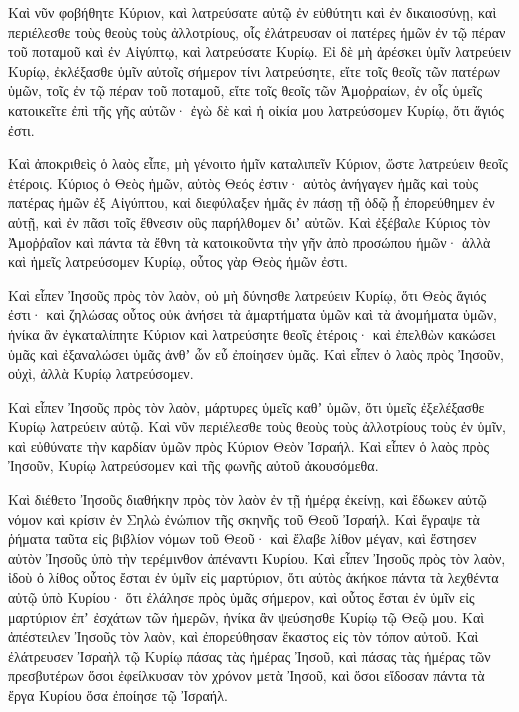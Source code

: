 {\par }{\PP {}Καὶ νῦν φοβήθητε Κύριον, καὶ λατρεύσατε αὐτῷ ἐν εὐθύτητι καὶ ἐν δικαιοσύνῃ, καὶ περιέλεσθε τοὺς θεοὺς τοὺς ἀλλοτρίους, οἷς ἐλάτρευσαν οἱ πατέρες ἡμῶν ἐν τῷ πέραν τοῦ ποταμοῦ καὶ ἐν Αἰγύπτῳ, καὶ λατρεύσατε Κυρίῳ.
Εἰ δὲ μὴ ἀρέσκει ὑμῖν λατρεύειν Κυρίῳ, ἐκλέξασθε ὑμῖν αὐτοῖς σήμερον τίνι λατρεύσητε, εἴτε τοῖς θεοῖς τῶν πατέρων ὑμῶν, τοῖς ἐν τῷ πέραν τοῦ ποταμοῦ, εἴτε τοῖς θεοῖς τῶν Ἀμοῤραίων, ἐν οἷς ὑμεῖς κατοικεῖτε ἐπὶ τῆς γῆς αὐτῶν· ἐγὼ δὲ καὶ ἡ οἰκία μου λατρεύσομεν Κυρίῳ, ὅτι ἅγιός ἐστι.
\par }{\PP {}Καὶ ἀποκριθεὶς ὁ λαὸς εἶπε, μὴ γένοιτο ἡμῖν καταλιπεῖν Κύριον, ὥστε λατρεύειν θεοῖς ἑτέροις.
Κύριος ὁ Θεὸς ἡμῶν, αὐτὸς Θεός ἐστιν· αὐτὸς ἀνήγαγεν ἡμᾶς καὶ τοὺς πατέρας ἡμῶν ἐξ Αἰγύπτου, καἰ διεφύλαξεν ἡμᾶς ἐν πάσῃ τῇ ὁδῷ ᾗ ἐπορεύθημεν ἐν αὐτῇ, καὶ ἐν πᾶσι τοῖς ἔθνεσιν οὓς παρήλθομεν διʼ αὐτῶν.
Καὶ ἐξέβαλε Κύριος τὸν Ἀμοῤῥαῖον καὶ πάντα τὰ ἔθνη τὰ κατοικοῦντα τὴν γῆν ἀπὸ προσώπου ἡμῶν· ἀλλὰ καὶ ἡμεῖς λατρεύσομεν Κυρίῳ, οὗτος γὰρ Θεὸς ἡμῶν ἐστι.
\par }{\PP {}Καὶ εἶπεν Ἰησοῦς πρὸς τὸν λαὸν, οὐ μὴ δύνησθε λατρεύειν Κυρίῳ, ὅτι Θεὸς ἅγιός ἐστι· καὶ ζηλώσας οὗτος οὐκ ἀνήσει τὰ ἁμαρτήματα ὑμῶν καὶ τὰ ἀνομήματα ὑμῶν,
ἡνίκα ἂν ἐγκαταλίπητε Κύριον καὶ λατρεύσητε θεοῖς ἑτέροις· καὶ ἐπελθὼν κακώσει ὑμᾶς καὶ ἐξαναλώσει ὑμᾶς ἀνθʼ ὧν εὖ ἐποίησεν ὑμᾶς.
Καὶ εἶπεν ὁ λαὸς πρὸς Ἰησοῦν, οὐχὶ, ἀλλὰ Κυρίῳ λατρεύσομεν.
\par }{\PP {}Καὶ εἶπεν Ἰησοῦς πρὸς τὸν λαὸν, μάρτυρες ὑμεῖς καθʼ ὑμῶν, ὅτι ὑμεῖς ἐξελέξασθε Κυρίῳ λατρεύειν αὐτῷ.
Καὶ νῦν περιέλεσθε τοὺς θεοὺς τοὺς ἀλλοτρίους τοὺς ἐν ὑμῖν, καὶ εὐθύνατε τὴν καρδίαν ὑμῶν πρὸς Κύριον Θεὸν Ἰσραήλ.
Καὶ εἶπεν ὁ λαὸς πρὸς Ἰησοῦν, Κυρίῳ λατρεύσομεν καὶ τῆς φωνῆς αὐτοῦ ἀκουσόμεθα.
\par }{\PP {}Καὶ διέθετο Ἰησοῦς διαθήκην πρὸς τὸν λαὸν ἐν τῇ ἡμέρᾳ ἐκείνῃ, καὶ ἔδωκεν αὐτῷ νόμον καὶ κρίσιν ἐν Σηλὼ ἐνώπιον τῆς σκηνῆς τοῦ Θεοῦ Ἰσραήλ.
Καὶ ἔγραψε τὰ ῥήματα ταῦτα εἰς βιβλίον νόμων τοῦ Θεοῦ· καὶ ἔλαβε λίθον μέγαν, καὶ ἔστησεν αὐτὸν Ἰησοῦς ὑπὸ τὴν τερέμινθον ἀπέναντι Κυρίου.
Καὶ εἶπεν Ἰησοῦς πρὸς τὸν λαὸν, ἰδοὺ ὁ λίθος οὗτος ἔσται ἐν ὑμῖν εἰς μαρτύριον, ὅτι αὐτὸς ἀκήκοε πάντα τὰ λεχθέντα αὐτῷ ὑπὸ Κυρίου· ὅτι ἐλάλησε πρὸς ὑμᾶς σήμερον, καὶ οὗτος ἔσται ἐν ὑμῖν εἰς μαρτύριον ἐπʼ ἐσχάτων τῶν ἡμερῶν, ἡνίκα ἂν ψεύσησθε Κυρίῳ τῷ Θεῷ μου.
Καὶ ἀπέστειλεν Ἰησοῦς τὸν λαὸν, καὶ ἐπορεύθησαν ἕκαστος εἰς τὸν τόπον αὐτοῦ.
Καὶ ἐλάτρευσεν Ἰσραὴλ τῷ Κυρίῳ πάσας τὰς ἡμέρας Ἰησοῦ, καὶ πάσας τὰς ἡμέρας τῶν πρεσβυτέρων ὅσοι ἐφείλκυσαν τὸν χρόνον μετὰ Ἰησοῦ, καὶ ὅσοι εἴδοσαν πάντα τὰ ἔργα Κυρίου ὅσα ἐποίησε τῷ Ἰσραήλ.
}
